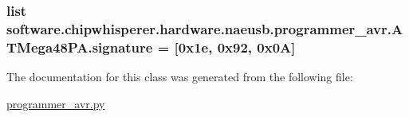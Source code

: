 \subsubsection[{signature}]{\setlength{\rightskip}{0pt plus 5cm}list software.\+chipwhisperer.\+hardware.\+naeusb.\+programmer\+\_\+avr.\+A\+T\+Mega48\+P\+A.\+signature = \mbox{[}0x1e, 0x92, 0x0\+A\mbox{]}\hspace{0.3cm}{\ttfamily [static]}}\label{classsoftware_1_1chipwhisperer_1_1hardware_1_1naeusb_1_1programmer__avr_1_1ATMega48PA_a86ccd541d3d0866f7fdebdd06a7b7073}


The documentation for this class was generated from the following file\+:\begin{DoxyCompactItemize}
\item 
\hyperlink{programmer__avr_8py}{programmer\+\_\+avr.\+py}\end{DoxyCompactItemize}
